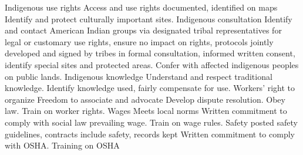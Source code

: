 \textbar{}Indigenous use rights \textbar{} Access and use rights
documented, identified on maps \textbar{} Identify and protect
culturally important sites. \textbar{} \textbar{}Indigenous consultation
\textbar{} Identify and contact American Indian groups via designated
tribal representatives for legal or customary use rights, ensure no
impact on rights, protocols jointly developed and signed by tribes in
formal consultation, informed written consent, identify special sites
and protected areas. \textbar{} Confer with affected indigenous peoples
on public lands. \textbar{}Indigenous knowledge \textbar{} Understand
and respect traditional knowledge. \textbar{} Identify knowledge used,
fairly compensate for use. \textbar{} \textbar{}Workers' right to
organize \textbar{} Freedom to associate and advocate \textbar{} Develop
dispute resolution. \textbar{} Obey law. Train on worker rights.
\textbar{} \textbar{}Wages \textbar{} Meets local norms \textbar{}
Written commitment to comply with social law prevailing wage. Train on
wage rules. \textbar{} \textbar{}Safety \textbar{} posted safety
guidelines, contracts include safety, records kept \textbar{} Written
commitment to comply with OSHA. Training on OSHA \textbar{}

